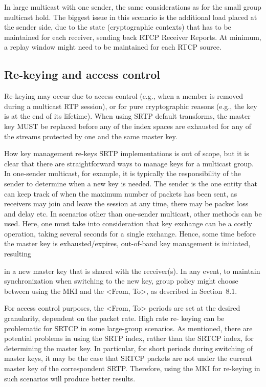 \documentclass{article}
\begin{document}
In large multicast with one sender, the same considerations as for the small group multicast hold.  The biggest issue in this scenario is the additional load placed at the sender side, due to the state (cryptographic contexts) that has to be maintained for each receiver, sending back RTCP Receiver Reports.  At minimum, a replay window might need to be maintained for each RTCP source.

\subsection{Re-keying and access control}

Re-keying may occur due to access control (e.g., when a member is removed during a multicast RTP session), or for pure cryptographic reasons (e.g., the key is at the end of its lifetime).  When using SRTP default transforms, the master key MUST be replaced before any of the index spaces are exhausted for any of the streams protected by one and the same master key.

How key management re-keys SRTP implementations is out of scope, but it is clear that there are straightforward ways to manage keys for a multicast group.  In one-sender multicast, for example, it is typically the responsibility of the sender to determine when a new key is needed.  The sender is the one entity that can keep track of when the maximum number of packets has been sent, as receivers may join and leave the session at any time, there may be packet loss and delay etc.  In scenarios other than one-sender multicast, other methods can be used.  Here, one must take into consideration that key exchange can be a costly operation, taking several seconds for a single exchange.  Hence, some time before the master key is exhausted/expires, out-of-band key management is initiated, resulting

in a new master key that is shared with the receiver(s).  In any event, to maintain synchronization when switching to the new key, group policy might choose between using the MKI and the <From, To>, as described in Section~8.1.

For access control purposes, the <From, To> periods are set at the desired granularity, dependent on the packet rate.  High rate re- keying can be problematic for SRTCP in some large-group scenarios. As mentioned, there are potential problems in using the SRTP index, rather than the SRTCP index, for determining the master key.  In particular, for short periods during switching of master keys, it may be the case that SRTCP packets are not under the current master key of the correspondent SRTP.  Therefore, using the MKI for re-keying in such scenarios will produce better results.
\end{document}
